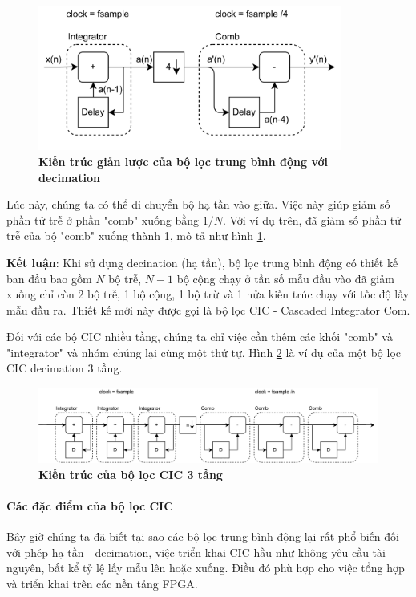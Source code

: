 \begin{figure}[H]
    \centering
    \includegraphics[width=10cm]{Images/Chuong2/cic/cic_7.png}
    \caption[Kiến trúc giản lược của bộ lọc trung bình động với decimation]{\bfseries \fontsize{12pt}{0pt}\selectfont Kiến trúc giản lược của bộ lọc trung bình động với decimation}
    \label{cic_7}
\end{figure}
Lúc này, chúng ta có thể di chuyển bộ hạ tần vào giữa. Việc này giúp giảm số phần tử trễ ở phần "comb" xuống bằng $1/N$. Với ví dụ trên, đã giảm số phần tử trễ của bộ "comb" xuống thành 1, mô tả như hình \ref{cic_7}.

\textbf{Kết luận}: Khi sử dụng decination (hạ tần), bộ lọc trung bình động có thiết kế ban đầu bao gồm $N$ bộ trễ, $N-1$ bộ cộng chạy ở tần số mẫu đầu vào đã giảm xuống chỉ còn 2 bộ trễ, 1 bộ cộng, 1 bộ trừ và 1 nửa kiến trúc chạy với tốc độ lấy mẫu đầu ra. Thiết kế mới này được gọi là bộ lọc CIC - Cascaded Integrator Com.

Đối với các bộ CIC nhiều tầng, chúng ta chỉ việc cần thêm các khối "comb" và "integrator" và nhóm chúng lại cùng một thứ tự. Hình \ref{cic_8} là ví dụ của một bộ lọc CIC decimation 3 tầng.
\begin{figure}[H]
    \centering
    \includegraphics[width=14cm]{Images/Chuong2/cic/cic_8.png}
    \caption[Kiến trúc của bộ lọc CIC 3 tầng ]{\bfseries \fontsize{12pt}{0pt}\selectfont Kiến trúc của bộ lọc CIC 3 tầng}
    \label{cic_8}
\end{figure}
\paragraph{Các đặc điểm của bộ lọc CIC}
Bây giờ chúng ta đã biết tại sao các bộ lọc trung bình động lại rất phổ biến đối với phép hạ tần - decimation, việc triển khai CIC hầu như không yêu cầu tài nguyên, bất kể tỷ lệ lấy mẫu lên hoặc xuống. Điều đó phù hợp cho việc tổng hợp và triển khai trên các nền tảng FPGA.

